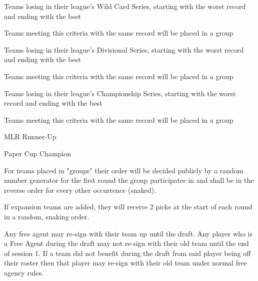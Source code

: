 \begin{deepEnumerate}
\begin{deepEnumerate}
\begin{deepEnumerate}
			\item Teams losing in their league’s Wild Card Series, starting with the worst record and ending with the best
			\begin{deepEnumerate}
				\item Teams meeting this criteria with the same record will be placed in a group
			\end{deepEnumerate}
			\item Teams losing in their league’s Divisional Series, starting with the worst record and ending with the best
			\begin{deepEnumerate}
				\item Teams meeting this criteria with the same record will be placed in a group
			\end{deepEnumerate}
			\item Teams losing in their league’s Championship Series, starting with the worst record and ending with the best
			\begin{deepEnumerate}
				\item Teams meeting this criteria with the same record will be placed in a group
			\end{deepEnumerate}
			\item MLR Runner-Up
			\item Paper Cup Champion
		\end{deepEnumerate}
		\item For teams placed in "groups" their order will be decided publicly by a random number generator for the first round
		 the group participates in and shall be in the reverse order for every other occurrence (snaked).
		\item If expansion teams are added, they will receive 2 picks at the start of each round in a random, snaking order.
	\end{deepEnumerate}
	\item Any free agent may re-sign with their team up until the draft. Any player who is a Free Agent during the draft may
	 not re-sign with their old team until the end of session 1. If a team did not benefit during the draft from said player being
	 off their roster then that player may re-sign with their old team under normal free agency rules. 
\end{deepEnumerate}